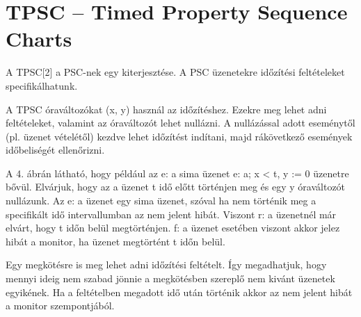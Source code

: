 \chapter{TPSC – Timed Property Sequence Charts}
A TPSC[2] a PSC-nek egy kiterjesztése. A PSC üzenetekre időzítési feltételeket specifikálhatunk.

A TPSC óraváltozókat (x, y) használ az időzítéshez. Ezekre meg lehet adni feltételeket, valamint az óraváltozót lehet nullázni. A nullázással adott eseménytől (pl. üzenet vételétől) kezdve lehet időzítést indítani, majd rákövetkező események időbeliségét ellenőrizni.

A 4. ábrán látható, hogy például az e: a sima üzenet e: a; x < t, y := 0 üzenetre bővül. Elvárjuk, hogy az a üzenet t idő előtt történjen meg és egy y óraváltozót nullázunk. Az e: a üzenet egy sima üzenet, szóval ha nem történik meg a specifikált idő intervallumban az nem jelent hibát. Viszont r: a üzenetnél már elvárt, hogy t időn belül megtörténjen. f: a üzenet esetében viszont akkor jelez hibát a monitor, ha üzenet megtörtént t időn belül.

Egy megkötésre is meg lehet adni időzítési feltételt. Így megadhatjuk, hogy mennyi ideig nem szabad jönnie a megkötésben szereplő nem kivánt üzenetek egyikének. Ha a feltételben megadott idő után történik akkor az nem jelent hibát a monitor szempontjából.